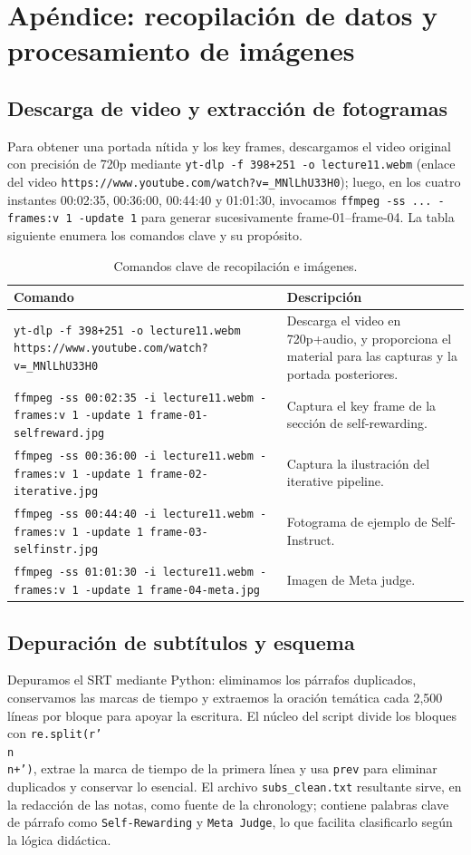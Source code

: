 \section{Apéndice: recopilación de datos y procesamiento de imágenes}
\subsection{Descarga de video y extracción de fotogramas}
Para obtener una portada nítida y los key frames, descargamos el video original con precisión de 720p mediante \texttt{yt-dlp -f 398+251 -o lecture11.webm} (enlace del video \texttt{https://www.youtube.com/watch?v=\_MNlLhU33H0}); luego, en los cuatro instantes 00:02:35, 00:36:00, 00:44:40 y 01:01:30, invocamos \texttt{ffmpeg -ss ... -frames:v 1 -update 1} para generar sucesivamente frame-01–frame-04. La tabla siguiente enumera los comandos clave y su propósito.

\begin{table}[H]
\centering
\begin{tabular}{p{6cm}p{9cm}}
\toprule
Comando & Descripción \\
\midrule
\texttt{yt-dlp -f 398+251 -o lecture11.webm https://www.youtube.com/watch?v=\_MNlLhU33H0} & Descarga el video en 720p+audio, y proporciona el material para las capturas y la portada posteriores. \\
\texttt{ffmpeg -ss 00:02:35 -i lecture11.webm -frames:v 1 -update 1 frame-01-selfreward.jpg} & Captura el key frame de la sección de self-rewarding. \\
\texttt{ffmpeg -ss 00:36:00 -i lecture11.webm -frames:v 1 -update 1 frame-02-iterative.jpg} & Captura la ilustración del iterative pipeline. \\
\texttt{ffmpeg -ss 00:44:40 -i lecture11.webm -frames:v 1 -update 1 frame-03-selfinstr.jpg} & Fotograma de ejemplo de Self-Instruct. \\
\texttt{ffmpeg -ss 01:01:30 -i lecture11.webm -frames:v 1 -update 1 frame-04-meta.jpg} & Imagen de Meta judge. \\
\bottomrule
\end{tabular}
\caption{Comandos clave de recopilación e imágenes.}
\end{table}

\subsection{Depuración de subtítulos y esquema}
Depuramos el SRT mediante Python: eliminamos los párrafos duplicados, conservamos las marcas de tiempo y extraemos la oración temática cada 2,500 líneas por bloque para apoyar la escritura. El núcleo del script divide los bloques con \texttt{re.split(r'\\n\\n+')}, extrae la marca de tiempo de la primera línea y usa \texttt{prev} para eliminar duplicados y conservar lo esencial. El archivo \texttt{subs\_clean.txt} resultante sirve, en la redacción de las notas, como fuente de la chronology; contiene palabras clave de párrafo como \texttt{Self-Rewarding} y \texttt{Meta Judge}, lo que facilita clasificarlo según la lógica didáctica.

